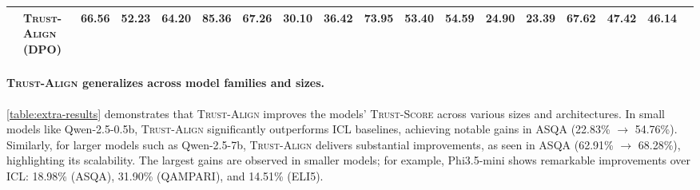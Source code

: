 \documentclass{article} %
\newcommand{\cdashlinelr}[1]{%
  \noalign{\vskip 2mm}  %
  \cdashline{#1}        %
  \noalign{\vskip 2mm}  %
}
\newcommand{\hlinelr}[1]{%
  \noalign{\vskip 2mm}  %
  \hline    
  \noalign{\vskip 2mm}  %
}
\newcommand{\method}[0]{\textsc{Trust-Align}}
\newcommand{\metric}[0]{\textsc{Trust-Score}}
\begin{document}
\begin{table}[htb!]
{\begin{tabular}{ll*{16}{c}}
\cdashlinelr{2-17}
& \method{} (DPO) & 66.56 & 52.23 & \cellcolor{lightyellow}64.20 & \cellcolor{lightyellow}85.36 & \cellcolor{lightyellow}67.26 & 30.10 & \cellcolor{lightyellow}36.42 & \cellcolor{lightyellow}73.95 & \cellcolor{lightyellow}53.40 & \cellcolor{lightyellow}54.59 & 24.90 & \cellcolor{lightyellow}23.39 & \cellcolor{lightyellow}67.62 & \cellcolor{lightyellow}47.42 & \cellcolor{lightyellow} 46.14 \\



\bottomrule
\end{tabular}
}


\end{table}

\paragraph{\method{} generalizes across model families and sizes.} \cref{table:extra-results} demonstrates that \method{} improves the models' \metric{} across various sizes and architectures. In small models like Qwen-2.5-0.5b, \method{} significantly outperforms ICL baselines, achieving notable gains in ASQA (22.83\% $\rightarrow$ 54.76\%). Similarly, for larger models such as Qwen-2.5-7b, \method{} delivers substantial improvements, as seen in ASQA (62.91\% $\rightarrow$ 68.28\%), highlighting its scalability. The largest gains are observed in smaller models; for example, Phi3.5-mini shows remarkable improvements over ICL: 18.98\% (ASQA), 31.90\% (QAMPARI), and 14.51\% (ELI5). 
\end{document}
